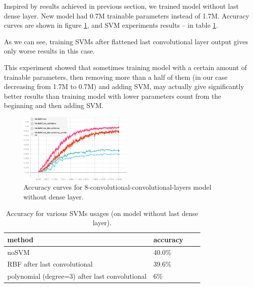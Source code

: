 \documentclass[a4paper]{article}
\begin{document}
Inspired by results achieved in previous section,
we trained model without last dense layer.
New model had 0.7M trainable parameters instead of 1.7M.
Accuracy curves are shown in figure \ref{fig:noDense},
and SVM experiments results -- in table \ref{table:svm2}.

As we can see, training SVMs after flattened last convolutional
layer output gives only worse results in this case.

This experiment showed that sometimes training model with a certain
amount of trainable parameters, then removing more than a half
of them (in our case decreasing from 1.7M to 0.7M) and adding SVM,
may actually give significantly better results than training model with lower
parameters count from the beginning and then adding SVM.

\begin{figure}[!h]
    \centering
    \includegraphics[page=2,width=0.5\textwidth]{noDense.png}
    \caption[]{Accuracy curves for 8-convolutional-convolutional-layers model without dense layer.
    \label{fig:noDense}
    }
\end{figure}

\begin{table}[!hbt]
    \caption{Accuracy for various SVMs usages (on model without last dense layer).
    \label{table:svm2}
    }
\begin{center}
    \begin{tabular}{| l | l | l | l |}
    \hline
    method&accuracy \\
    \hline
        noSVM & 40.0\% \\
        RBF after last convolutional & 39.6\% \\
        polynomial (degree=3) after last convolutional & 6\% \\
    \hline
    \end{tabular}
\end{center}
\end{table}
\end{document}
